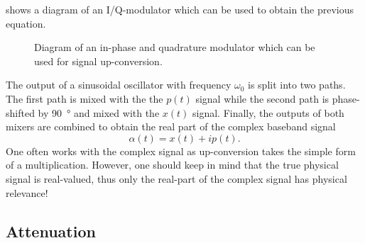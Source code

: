  shows a diagram of an I/Q-modulator which can be used to obtain the previous equation.
\begin{figure}[htb]
	\centering
	
	\caption{Diagram of an in-phase and quadrature modulator which can be used for signal up-conversion.}\label{fig:iqmod}
\end{figure}
The output of a sinusoidal oscillator with frequency $\omega_0$ is split into two paths.
The first path is mixed with the the $p(t)$ signal while the second path is phase-shifted by \SI{90}{\degree} and mixed with the $x(t)$ signal.
Finally, the outputs of both mixers are combined to obtain the real part of the complex baseband signal
\begin{equation}
	\alpha(t)
	=
	x(t)
	+
	ip(t)
	.
\end{equation}
One often works with the complex signal as up-conversion takes the simple form of a multiplication.
However, one should keep in mind that the true physical signal is real-valued, thus only the real-part of the complex signal has physical relevance!

\subsection{Attenuation}
